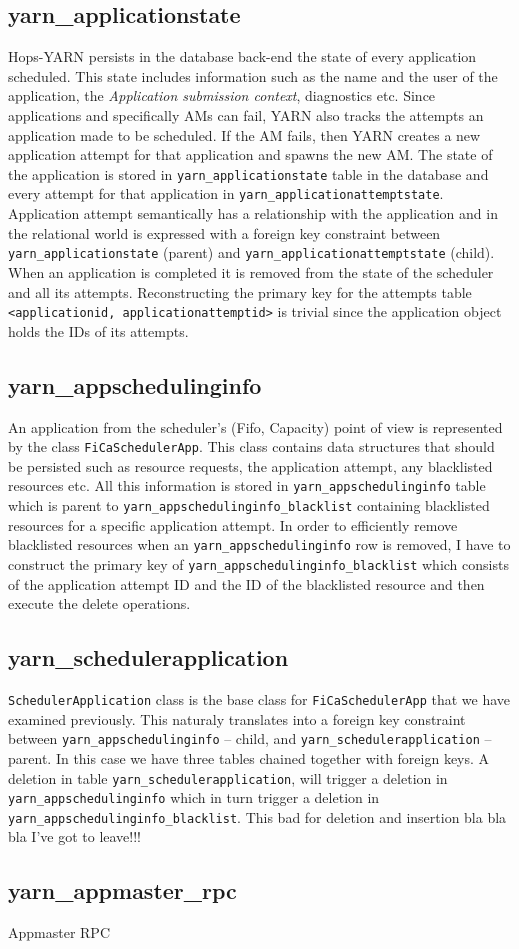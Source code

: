 \subsection{yarn\_applicationstate}
\label{ssec:impl_fk_appstate}
Hops-YARN persists in the database back-end the state of every
application scheduled. This state includes information such as the
name and the user of the application, the \emph{Application submission
  context}, diagnostics etc. Since applications and specifically AMs
can fail, YARN also tracks the attempts an application made to be scheduled.
If the AM fails, then YARN creates a new application attempt
for that application and spawns the new AM. The state of the
application is stored in \texttt{yarn\_applicationstate} table in the
database and every attempt for that application in
\texttt{yarn\_applicationattemptstate}. Application attempt
semantically has a relationship with the application and in the
relational world is expressed with a foreign key constraint
between \texttt{yarn\_applicationstate} (parent) and
\texttt{yarn\_applicationattemptstate} (child). When an application
is completed it is removed from the state of the scheduler and all
its attempts. Reconstructing the primary key for the attempts table
\texttt{<applicationid, applicationattemptid>} is trivial since the
application object holds the IDs of its attempts.

\subsection{yarn\_appschedulinginfo}
\label{ssec:impl_fk_appschedulinginfo}
An application from the scheduler's (Fifo, Capacity) point of view is
represented by the class \texttt{FiCaSchedulerApp}. This class
contains data structures that should be persisted such as resource
requests, the application attempt, any blacklisted resources etc. All
this information is stored in \texttt{yarn\_appschedulinginfo} table
which is parent to \texttt{yarn\_appschedulinginfo\_blacklist}
containing blacklisted resources for a specific application
attempt. In order to efficiently remove blacklisted resources when an
\texttt{yarn\_appschedulinginfo} row is removed, I have to construct
the primary key of \texttt{yarn\_appschedulinginfo\_blacklist} which
consists of the application attempt ID and the ID of the blacklisted
resource and then execute the delete operations.

\subsection{yarn\_schedulerapplication}
\label{ssec:impl_fk_schedulerapp}
\texttt{SchedulerApplication} class is the base class for
\texttt{FiCaSchedulerApp} that we have examined previously. This
naturaly translates into a foreign key constraint between
\texttt{yarn\_appschedulinginfo} -- child, and
\texttt{yarn\_schedulerapplication} -- parent. In this case we have
three tables chained together with foreign keys. A deletion in table 
\texttt{yarn\_schedulerapplication}, will trigger a deletion in
\texttt{yarn\_appschedulinginfo} which in turn trigger a deletion in
\texttt{yarn\_appschedulinginfo\_blacklist}. This bad for deletion and
insertion bla bla bla I've got to leave!!!

\subsection{yarn\_appmaster\_rpc}
\label{ssec:impl_fk_appmaster_rpc}
Appmaster RPC